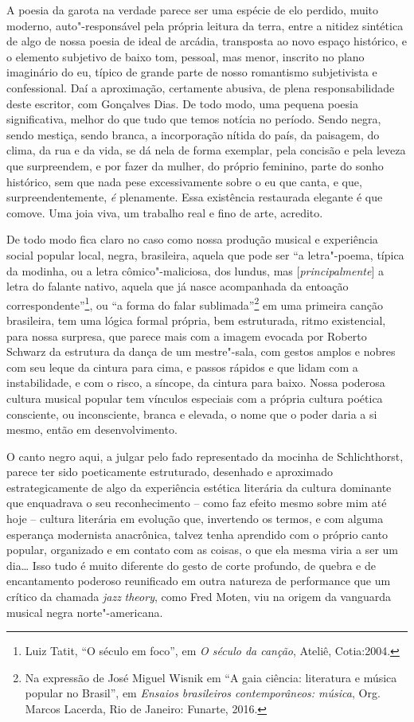 A poesia da garota na verdade parece ser uma espécie de elo perdido,
muito moderno, auto"-responsável pela própria leitura da terra, entre a
nitidez sintética de algo de nossa poesia de ideal de arcádia,
transposta ao novo espaço histórico, e o elemento subjetivo de baixo
tom, pessoal, mas menor, inscrito no plano imaginário do eu, típico de
grande parte de nosso romantismo subjetivista e confessional. Daí a
aproximação, certamente abusiva, de plena responsabilidade deste
escritor, com Gonçalves Dias. De todo modo, uma pequena poesia
significativa, melhor do que tudo que temos notícia no período. Sendo
negra, sendo mestiça, sendo branca, a incorporação nítida do país, da
paisagem, do clima, da rua e da vida, se dá nela de forma exemplar, pela
concisão e pela leveza que surpreendem, e por fazer da mulher, do
próprio feminino, parte do sonho histórico, sem que nada pese
excessivamente sobre o eu que canta, e que, surpreendentemente, \emph{é}
plenamente. Essa existência restaurada elegante é que comove. Uma joia
viva, um trabalho real e fino de arte, acredito.

De todo modo fica claro no caso como nossa produção musical e
experiência social popular local, negra, brasileira, aquela que pode ser
``a letra"-poema, típica da modinha, ou a letra cômico"-maliciosa, dos
lundus, mas {[}\emph{principalmente}{]} a letra do falante nativo,
aquela que já nasce acompanhada da entoação correspondente''\footnote{Luiz
  Tatit, ``O século  em foco'', em \emph{O século da canção}, Ateliê,
  Cotia:2004.}, ou ``a forma do falar sublimada''\footnote{Na expressão
  de José Miguel Wisnik em ``A gaia ciência: literatura e música popular
  no Brasil'', em \emph{Ensaios brasileiros contemporâneos: música},
  Org. Marcos Lacerda, Rio de Janeiro: Funarte, 2016.} em uma primeira
canção brasileira, tem uma lógica formal própria, bem
estruturada, ritmo existencial, para nossa surpresa, que parece mais com
a imagem evocada por Roberto Schwarz da estrutura da dança de um
mestre"-sala, com gestos amplos e nobres com seu leque da cintura para
cima, e passos rápidos e que lidam com a instabilidade, e com o risco, a
síncope, da cintura para baixo. Nossa poderosa cultura musical popular
tem vínculos especiais com a própria cultura poética consciente, ou
inconsciente, branca e elevada, o nome que o poder daria a si mesmo,
então em desenvolvimento.

O canto negro aqui, a julgar pelo fado representado da mocinha de
Schlichthorst, parece ter sido poeticamente estruturado, desenhado e
aproximado estrategicamente de algo da experiência estética literária da
cultura dominante que enquadrava o seu reconhecimento -- como faz efeito
mesmo sobre mim até hoje -- cultura literária em evolução que,
invertendo os termos, e com alguma esperança modernista anacrônica,
talvez tenha aprendido com o próprio canto popular, organizado e em
contato com as coisas, o que ela mesma viria a ser um dia\ldots{} Isso tudo é
muito diferente do gesto de corte profundo, de quebra e de encantamento
poderoso reunificado em outra natureza de performance que um crítico da
chamada \emph{jazz} \emph{theory}, como Fred Moten, viu na origem da
vanguarda musical negra norte"-americana.


